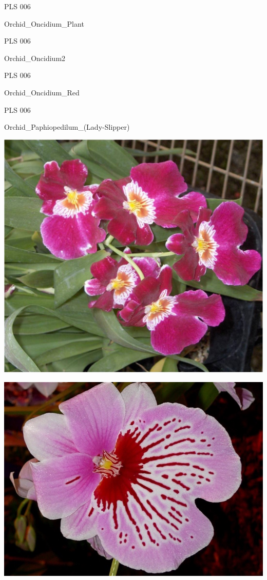 \documentclass{article}
\begin{document}
\noindent  PLS 006
\vfill
\centerline{{\huge Orchid\_Oncidium\_Plant }}
\vfill
\newpage

\noindent  PLS 006
\vfill
\centerline{{\huge Orchid\_Oncidium2 }}
\vfill
\newpage

\noindent  PLS 006
\vfill
\centerline{{\huge Orchid\_Oncidium\_Red }}
\vfill
\newpage

\noindent  PLS 006
\vfill
\centerline{{\huge Orchid\_Paphiopedilum\_(Lady-Slipper) }}
\vfill
\newpage

\begin{center}
\includegraphics[height=0.925\paperheight]{../Orchid_Miltonia.jpg}
\end{center}
\newpage

\begin{center}
\includegraphics[height=0.925\paperheight]{../Orchid_Miltonia2.jpg}
\end{center}
\newpage
\end{document}
